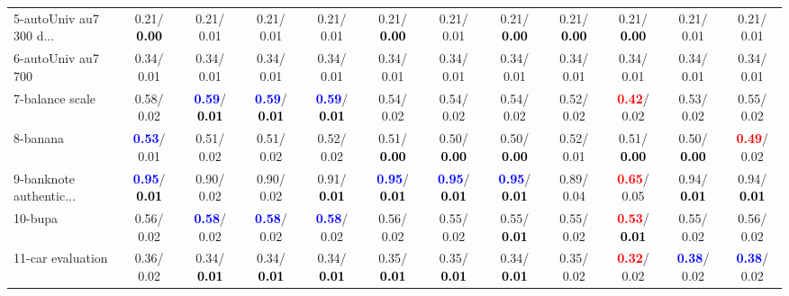 \begin{table}[h]
\begin{center}
{\begin{tabular}{lc|c|c|c|c|c|c|c|c|c|c}
5-autoUniv au7 300 d... &   0.21/\textcolor{black}{\textbf{  0.00}} &   0.21/  0.01 &   0.21/  0.01 &   0.21/  0.01 &   0.21/\textcolor{black}{\textbf{  0.00}} &   0.21/  0.01 &   0.21/\textcolor{black}{\textbf{  0.00}} &   0.21/\textcolor{black}{\textbf{  0.00}} &   0.21/\textcolor{black}{\textbf{  0.00}} &   0.21/  0.01 &   0.21/  0.01 \\
6-autoUniv au7 700 &   0.34/  0.01 &   0.34/  0.01 &   0.34/  0.01 &   0.34/  0.01 &   0.34/  0.01 &   0.34/  0.01 &   0.34/  0.01 &   0.34/  0.01 &   0.34/  0.01 &   0.34/  0.01 &   0.34/  0.01 \\
7-balance scale &   0.58/  0.02 & \textcolor{blue}{\textbf{  0.59}}/\textcolor{black}{\textbf{  0.01}} & \textcolor{blue}{\textbf{  0.59}}/\textcolor{black}{\textbf{  0.01}} & \textcolor{blue}{\textbf{  0.59}}/\textcolor{black}{\textbf{  0.01}} &   0.54/  0.02 &   0.54/  0.02 &   0.54/  0.02 &   0.52/  0.02 & \textcolor{red}{\textbf{  0.42}}/  0.02 &   0.53/  0.02 &   0.55/  0.02 \\ \hline
8-banana & \textcolor{blue}{\textbf{  0.53}}/  0.01 &   0.51/  0.02 &   0.51/  0.02 &   0.52/  0.02 &   0.51/\textcolor{black}{\textbf{  0.00}} &   0.50/\textcolor{black}{\textbf{  0.00}} &   0.50/\textcolor{black}{\textbf{  0.00}} &   0.52/  0.01 &   0.51/\textcolor{black}{\textbf{  0.00}} &   0.50/\textcolor{black}{\textbf{  0.00}} & \textcolor{red}{\textbf{  0.49}}/  0.02 \\
9-banknote authentic... & \textcolor{blue}{\textbf{  0.95}}/\textcolor{black}{\textbf{  0.01}} &   0.90/  0.02 &   0.90/  0.02 &   0.91/\textcolor{black}{\textbf{  0.01}} & \textcolor{blue}{\textbf{  0.95}}/\textcolor{black}{\textbf{  0.01}} & \textcolor{blue}{\textbf{  0.95}}/\textcolor{black}{\textbf{  0.01}} & \textcolor{blue}{\textbf{  0.95}}/\textcolor{black}{\textbf{  0.01}} &   0.89/  0.04 & \textcolor{red}{\textbf{  0.65}}/  0.05 &   0.94/\textcolor{black}{\textbf{  0.01}} &   0.94/\textcolor{black}{\textbf{  0.01}} \\
10-bupa &   0.56/  0.02 & \textcolor{blue}{\textbf{  0.58}}/  0.02 & \textcolor{blue}{\textbf{  0.58}}/  0.02 & \textcolor{blue}{\textbf{  0.58}}/  0.02 &   0.56/  0.02 &   0.55/  0.02 &   0.55/\textcolor{black}{\textbf{  0.01}} &   0.55/  0.02 & \textcolor{red}{\textbf{  0.53}}/\textcolor{black}{\textbf{  0.01}} &   0.55/  0.02 &   0.56/  0.02 \\
11-car evaluation &   0.36/  0.02 &   0.34/\textcolor{black}{\textbf{  0.01}} &   0.34/\textcolor{black}{\textbf{  0.01}} &   0.34/\textcolor{black}{\textbf{  0.01}} &   0.35/\textcolor{black}{\textbf{  0.01}} &   0.35/\textcolor{black}{\textbf{  0.01}} &   0.34/\textcolor{black}{\textbf{  0.01}} &   0.35/  0.02 & \textcolor{red}{\textbf{  0.32}}/  0.02 & \textcolor{blue}{\textbf{  0.38}}/  0.02 & \textcolor{blue}{\textbf{  0.38}}/  0.02 \\

\end{tabular}}
\end{center}
\end{table}

